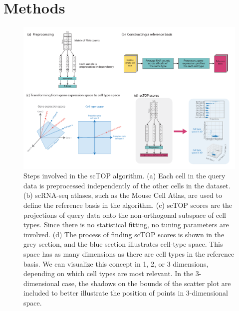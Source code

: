 \documentclass[aps,superscriptaddress, notitlepage,longbibliography]{revtex4-1}
\begin{document}
\section{Methods}
\begin{figure}
	\centering
		\includegraphics[scale=0.8]{figs/scTOP manuscript fig1 - no aggregate.pdf}
	\caption{Steps involved in the scTOP algorithm. (a) Each cell in the query data is preprocessed independently of the other cells in the dataset. (b) scRNA-seq atlases, such as the Mouse Cell Atlas, are used to define the reference basis in the algorithm. (c) scTOP scores are the projections of query data onto the non-orthogonal subspace of cell types. Since there is no statistical fitting, no tuning parameters are involved. (d) The process of finding scTOP scores is shown in the grey section, and the blue section illustrates cell-type space. This space has as many dimensions as there are cell types in the reference basis. We can visualize this concept in 1, 2, or 3 dimensions, depending on which cell types are most relevant. In the 3-dimensional case, the shadows on the bounds of the scatter plot are included to better illustrate the position of points in 3-dimensional space.}
	\label{FIG:1}
\end{figure}
\end{document}
